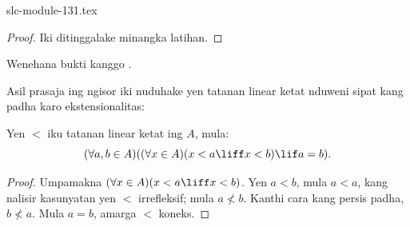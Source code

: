 \begin{filecontents*}[overwrite]{slc-module-131.tex}
\begin{proof}
Iki ditinggalake minangka latihan.
\end{proof}

\begin{prob}
Wenehana bukti kanggo .
\end{prob}

Asil prasaja ing ngisor iki nuduhake yen
tatanan linear ketat nduweni sipat kang
padha karo ekstensionalitas:

\begin{prop}
Yen $<$ iku tatanan linear ketat ing $A$, mula:
\[
  (\forall a, b \in A)((\forall x \in A)(x < a \liff x < b) \lif a = b).
\]
\end{prop}

\begin{proof}
Umpamakna $(\forall x \in A)(x < a \liff x < b)$.
Yen $a < b$, mula $a <a$,
kang nalisir kasunyatan yen $<$ irrefleksif;
mula $a \nless b$.
Kanthi cara kang persis padha, $b \nless a$.
Mula $a = b$, amarga $<$ koneks.
\end{proof}


\end{filecontents*}

